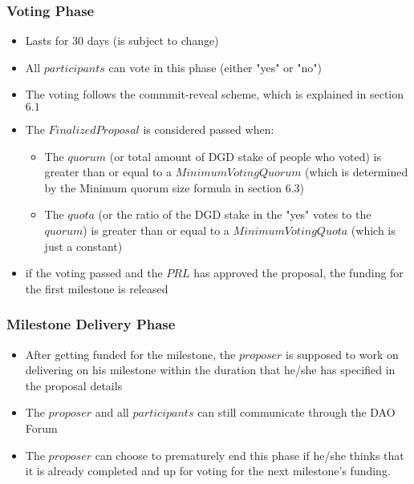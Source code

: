 \documentclass[11pt,a4paper,titlepage]{article}
\begin{document}
{{		\subsubsection{Voting Phase}{
			\begin{itemize}
				\item Lasts for 30 days (is subject to change)
				\item All $participants$ can vote in this phase (either "yes" or "no")
				\item The voting follows the commmit-reveal scheme, which is explained in section $6.1$
				\item The $Finalized Proposal$ is considered passed when:
				\begin{itemize}
					\item The $quorum$ (or total amount of DGD stake of people who voted) is greater than or equal to a $Minimum Voting Quorum$ (which is determined by the Minimum quorum size formula in section $6.3$)				
					\item The $quota$ (or the ratio of the DGD stake in the "yes" votes to the $quorum$) is greater than or equal to a $Minimum Voting Quota$ (which is just a constant)
				\end{itemize}
				\item if the voting passed and the $PRL$ has approved the proposal, the funding for the first milestone is released
			\end{itemize}
		}
		\subsubsection{Milestone Delivery Phase}{
			\begin{itemize}
				\item After getting funded for the milestone, the $proposer$ is supposed to work on delivering on his milestone within the duration that he/she has specified in the proposal details
				\item The $proposer$ and all $participants$ can still communicate through the DAO Forum
				\item The $proposer$ can choose to prematurely end this phase if he/she thinks that it is already completed and up for voting for the next milestone's funding.
			\end{itemize}
		}
}}
\end{document}
